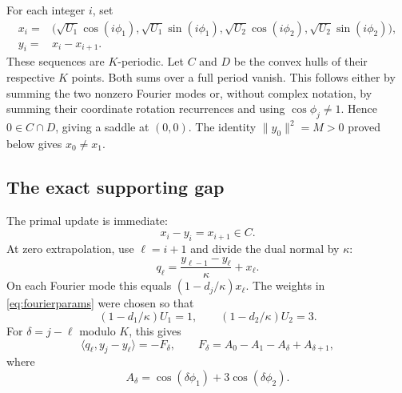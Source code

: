 \documentclass[11pt]{article}
\theoremstyle{remark}\newtheorem{remark}[theorem]{Remark}
\newcommand{\ip}[2]{\langle #1,#2\rangle}
\newcommand{\norm}[1]{\lVert #1\rVert}
\begin{document}
For each integer $i$, set
\begin{equation}\label{eq:fourierpoints}
\begin{aligned}
 x_i={}&\bigl(\sqrt{U_1}\cos(i\phi_1),\sqrt{U_1}\sin(i\phi_1),
              \sqrt{U_2}\cos(i\phi_2),\sqrt{U_2}\sin(i\phi_2)\bigr),\\
 y_i={}&x_i-x_{i+1}.
\end{aligned}
\end{equation}
These sequences are $K$-periodic. Let $C$ and $D$ be the convex hulls of their respective $K$ points. Both sums over a full period vanish. This follows either by summing the two nonzero Fourier modes or, without complex notation, by summing their coordinate rotation recurrences and using $\cos\phi_j\ne1$. Hence $0\in C\cap D$, giving a saddle at $(0,0)$. The identity $\norm{y_0}^2=M>0$ proved below gives $x_0\ne x_1$.

\subsection{The exact supporting gap}

The primal update is immediate:
\[
 x_i-y_i=x_{i+1}\in C.
\]
At zero extrapolation, use $\ell=i+1$ and divide the dual normal by $\kappa$:
\[
 q_\ell=\frac{y_{\ell-1}-y_\ell}{\kappa}+x_\ell.
\]
On each Fourier mode this equals $(1-d_j/\kappa)x_\ell$. The weights in \eqref{eq:fourierparams} were chosen so that
\[
 (1-d_1/\kappa)U_1=1,\qquad (1-d_2/\kappa)U_2=3.
\]
For $\delta=j-\ell$ modulo $K$, this gives
\begin{equation}\label{eq:fouriergap}
 \ip{q_\ell}{y_j-y_\ell}=-F_\delta,
 \qquad
 F_\delta=A_0-A_1-A_\delta+A_{\delta+1},
\end{equation}
where
\[
 A_\delta=\cos(\delta\phi_1)+3\cos(\delta\phi_2).
\]
\end{document}
